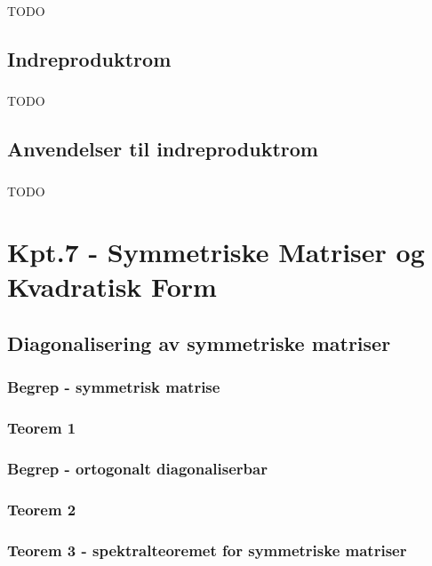 \documentclass{article}
\begin{document}
      \subsubsection{}
        TODO
    \subsection{Indreproduktrom}
      \subsubsection{}
        TODO
    \subsection{Anvendelser til indreproduktrom}
      \subsubsection{}
        TODO
  \section{Kpt.7 - Symmetriske Matriser og Kvadratisk Form}
    \subsection{Diagonalisering av symmetriske matriser}
      \subsubsection{Begrep - symmetrisk matrise}
        
      \subsubsection{Teorem 1}
        
      \subsubsection{Begrep - ortogonalt diagonaliserbar}
        
      \subsubsection{Teorem 2}
        
      \subsubsection{Teorem 3 - spektralteoremet for symmetriske matriser}
        
\end{document}
